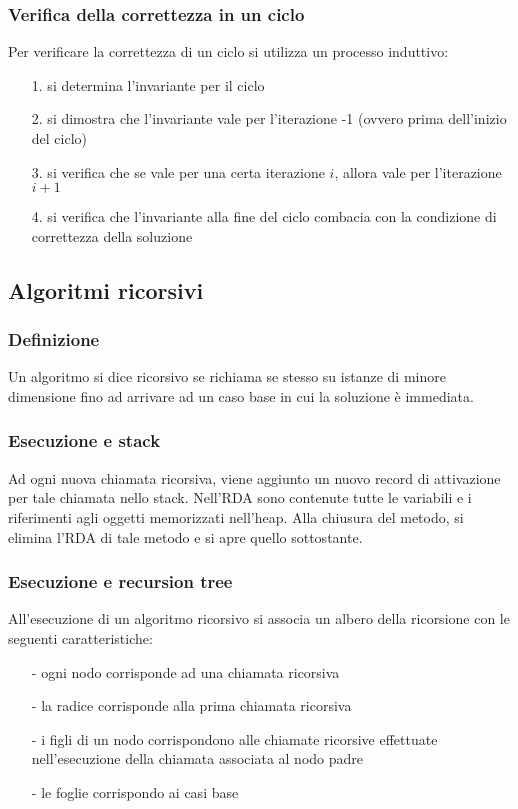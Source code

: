 \documentclass[a4paper]{article}
\begin{document}
\subsubsection*{Verifica della correttezza in un ciclo}
Per verificare la correttezza di un ciclo si utilizza un processo induttivo:
\begin{itemize}[topsep=3pt, itemsep=0pt]
	\item[1.] si determina l'invariante per il ciclo
	\item[2.] si dimostra che l'invariante vale per l'iterazione -1 (ovvero prima dell'inizio del ciclo)
	\item[3.] si verifica che se vale per una certa iterazione \(i\), allora vale per l'iterazione \(i+1\)
	\item[4.] si verifica che l'invariante alla fine del ciclo combacia con la condizione di correttezza della soluzione
\end{itemize}

\subsection{Algoritmi ricorsivi}
\subsubsection*{Definizione}
Un algoritmo si dice ricorsivo se richiama se stesso su istanze di minore dimensione fino ad arrivare ad un caso base in cui la
soluzione è immediata.

\subsubsection*{Esecuzione e stack}
Ad ogni nuova chiamata ricorsiva, viene aggiunto un nuovo record di attivazione per tale chiamata nello stack. Nell'RDA sono
contenute tutte le variabili e i riferimenti agli oggetti memorizzati nell'heap. Alla chiusura del metodo, si elimina l'RDA
di tale metodo e si apre quello sottostante.

\subsubsection*{Esecuzione e recursion tree}
All'esecuzione di un algoritmo ricorsivo si associa un albero della ricorsione con le seguenti caratteristiche:
\begin{itemize}[topsep=3pt, itemsep=0pt]
	\item[-] ogni nodo corrisponde ad una chiamata ricorsiva
	\item[-] la radice corrisponde alla prima chiamata ricorsiva
	\item[-] i figli di un nodo corrispondono alle chiamate ricorsive effettuate nell'esecuzione della chiamata associata al nodo padre
	\item[-] le foglie corrispondo ai casi base
\end{itemize}
\end{document}
